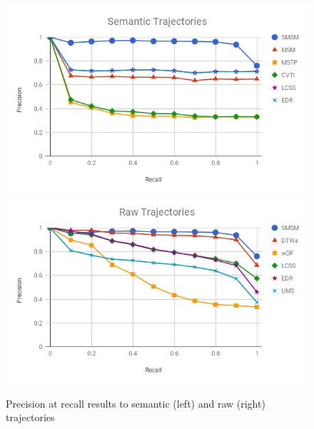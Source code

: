 \documentclass[12pt]{article}
\begin{document}
\begin{figure}[ht!]
\centerline{
\centering
\includegraphics[width=.55\textwidth]{Images/P_R-chart_Geolife.png}
\includegraphics[width=.55\textwidth]{Images/P_R-chart_Geolife-raw.png}
}
\caption{Precision at recall results to semantic (left) and raw (right) trajectories}
\label{fig:geolife_precision_recall}
\end{figure}
\end{document}
